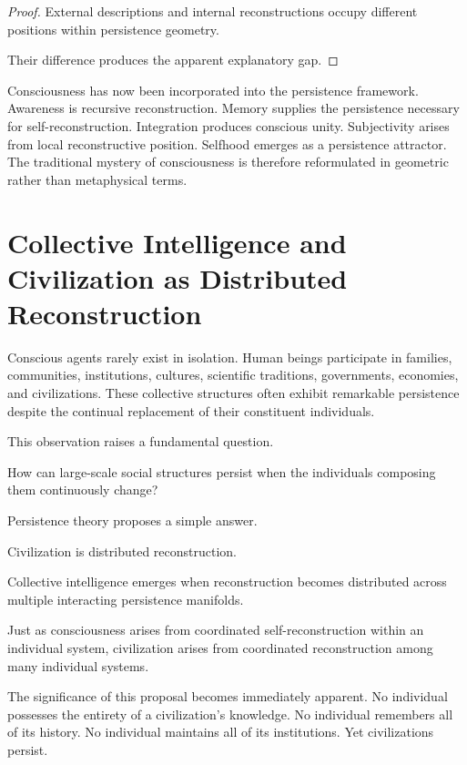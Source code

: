 \documentclass[12pt,oneside]{article}
\theoremstyle{definition}
\begin{document}
\begin{proof}

External descriptions and internal reconstructions occupy different positions within persistence geometry.

Their difference produces the apparent explanatory gap.

\end{proof}

Consciousness has now been incorporated into the persistence framework. Awareness is recursive reconstruction. Memory supplies the persistence necessary for self-reconstruction. Integration produces conscious unity. Subjectivity arises from local reconstructive position. Selfhood emerges as a persistence attractor. The traditional mystery of consciousness is therefore reformulated in geometric rather than metaphysical terms.

\section{Collective Intelligence and Civilization as Distributed Reconstruction}

Conscious agents rarely exist in isolation. Human beings participate in families, communities, institutions, cultures, scientific traditions, governments, economies, and civilizations. These collective structures often exhibit remarkable persistence despite the continual replacement of their constituent individuals.

This observation raises a fundamental question.

How can large-scale social structures persist when the individuals composing them continuously change?

Persistence theory proposes a simple answer.

Civilization is distributed reconstruction.

Collective intelligence emerges when reconstruction becomes distributed across multiple interacting persistence manifolds.

Just as consciousness arises from coordinated self-reconstruction within an individual system, civilization arises from coordinated reconstruction among many individual systems.

The significance of this proposal becomes immediately apparent. No individual possesses the entirety of a civilization's knowledge. No individual remembers all of its history. No individual maintains all of its institutions. Yet civilizations persist.
\end{document}
